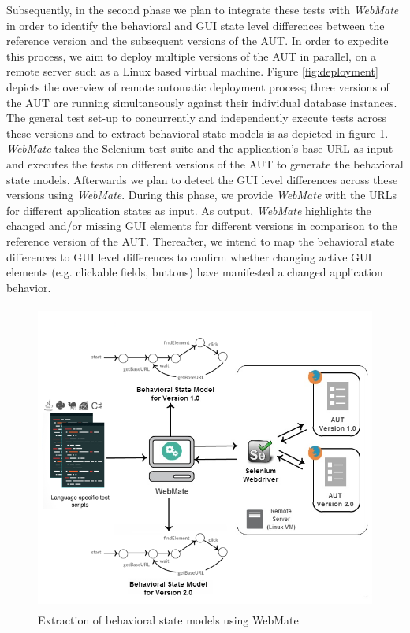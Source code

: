\vspace{-2mm}
Subsequently, in the second phase we plan to integrate these tests with \textit{WebMate} in order to identify the behavioral and GUI state level differences between the reference version and the subsequent versions of the AUT. In order to expedite this process, we aim to deploy multiple versions of the AUT in parallel, on a remote server such as a Linux based virtual machine. Figure  \ref{fig:deployment} depicts the overview of remote automatic deployment process; three versions of the AUT are running simultaneously against their individual database instances. The general test set-up to concurrently and independently execute tests across these versions and to extract behavioral state models is as depicted in figure \ref{fig:stateModelExtraction}.  \textit{WebMate} takes the Selenium test suite and the application’s base URL as input and executes the tests on different versions of the AUT to generate the behavioral state models. Afterwards we plan to detect the GUI level differences across these versions using \textit{WebMate}. During this phase, we provide \textit{WebMate} with the URLs for different application states as input. As output, \textit{WebMate} highlights the changed and/or missing GUI elements for different versions in comparison to the reference version of the AUT. Thereafter, we intend to map the behavioral state differences to GUI level differences to confirm whether changing active GUI elements (e.g. clickable fields, buttons) have manifested a changed application behavior.

\begin{figure}[h!]
\makeatletter 
\renewcommand{\thefigure}{\@arabic\c@figure}
\makeatother
    \centering
  \includegraphics[width=5in,height=4in]{./Figures/WebMate_state_extraction}
  \caption{Extraction of behavioral state models using WebMate \cite{webmate}}
  \label{fig:stateModelExtraction} 
\end{figure}

